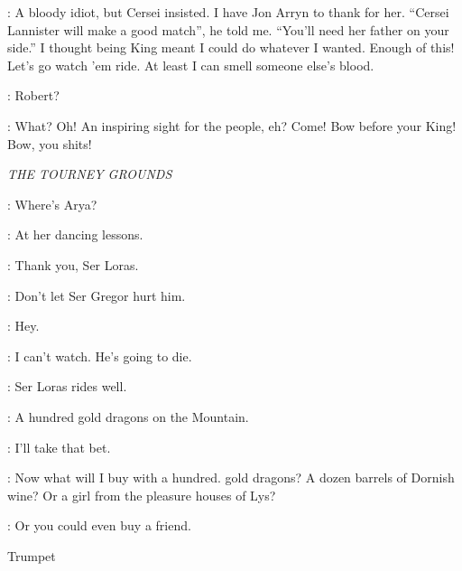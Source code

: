 \ROBERT: A bloody idiot, but Cersei insisted. I have Jon Arryn to
thank for her. ``Cersei Lannister will make a good match'', he told
me. ``You'll need her father on your side.'' I thought being King
meant I could do whatever I wanted. Enough of this! Let's go watch 'em
ride. At least I can smell someone else's blood. 

\NED: Robert? 

\ROBERT: What?  Oh! An inspiring sight for the people, eh? Come! Bow before your King! Bow, you shits! 

\scene

\textit{THE TOURNEY GROUNDS} 


\NED: Where's Arya? 

\SANSA: At her dancing lessons.  


\SANSA: Thank you, Ser Loras. 


\SANSA:  Don't let Ser Gregor hurt him. 

\NED: Hey. 

\SANSA: I can't watch. He's going to die. 

\NED: Ser Loras rides well. 

\LITTLEFINGER:  A hundred gold dragons on the Mountain. 

\RENLY: I'll take that bet. 

\LITTLEFINGER: Now what will I buy with a hundred. gold dragons? A dozen barrels of Dornish wine? Or a girl from the pleasure houses of Lys? 

\RENLY: Or you could even buy a friend. 

\sfx Trumpet


